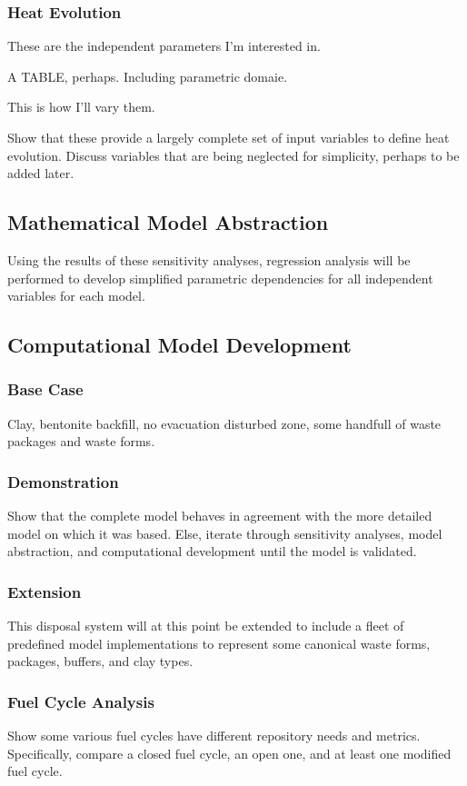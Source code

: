 \subsubsection{Heat Evolution}

These are the independent parameters I'm interested in.

A TABLE, perhaps. Including parametric domaie.

This is how I'll vary them.

Show that these provide a largely complete set of input variables to define 
heat evolution. Discuss variables that are being neglected for simplicity, 
perhaps to be added later. 

\subsection{Mathematical Model Abstraction}

Using the results of these sensitivity analyses, regression analysis will be 
performed to develop simplified parametric dependencies for all independent 
variables for each model. 

\subsection{Computational Model Development}

\subsubsection{Base Case}

Clay, bentonite backfill, no evacuation disturbed zone, some handfull of waste 
packages and waste forms.

\subsubsection{Demonstration}

Show that the complete model behaves in agreement with the more detailed model 
on which it was based. Else, iterate through sensitivity analyses, model 
abstraction, and computational development until the model is validated. 


\subsubsection{Extension}

This disposal system will at this point be extended to include a fleet of 
predefined model implementations to represent some canonical waste forms, 
packages, buffers, and clay types. 

\subsubsection{Fuel Cycle Analysis}

Show some various fuel cycles have different repository needs and metrics. 
Specifically, compare a closed fuel cycle, an open one, and at least one 
modified fuel cycle. 



